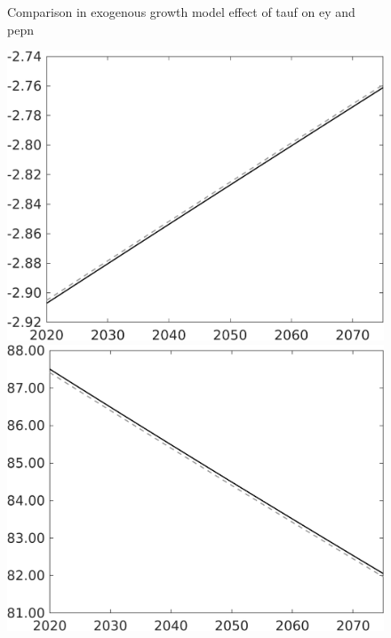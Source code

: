 \documentclass[12pt]{article}
\begin{document}
\begin{figure}{Comparison in exogenous growth model effect of tauf on ey and pepn }
		\begin{minipage}[]{0.32\textwidth}
			\includegraphics[width=1\textwidth]{../../codding_model/own_basedOnFried/optimalPol_010922_revision/figures/all_13Sept22/PerdifNoTauf_Equlab_regime0_CompTaul_EY_spillover0_nsk0_xgr1_knspil1_sep0_LFlimit0_emsbase0_countec0_GovRev0_etaa0.79_lgd0.png}
		\end{minipage}
		\begin{minipage}[]{0.32\textwidth}
			\includegraphics[width=1\textwidth]{../../codding_model/own_basedOnFried/optimalPol_010922_revision/figures/all_13Sept22/PerdifNoTauf_Equlab_regime0_CompTaul_pepn_spillover0_nsk0_xgr1_knspil1_sep0_LFlimit0_emsbase0_countec0_GovRev0_etaa0.79_lgd0.png}

\end{minipage}
\end{figure}
\end{document}
